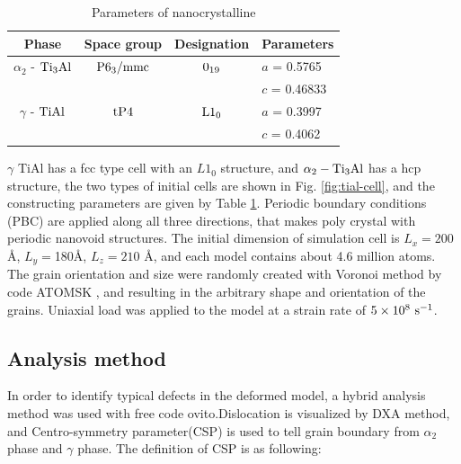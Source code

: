 \documentclass[metals,article,submit,moreauthors,pdftex,10pt,a4paper]{Definitions/mdpi}
\begin{document}
\begin{table}[ht]
	\caption{Parameters of nanocrystalline}
	\centering
	\begin{tabular}{c c c l}
	\toprule
	\textbf{Phase}			& {Space group}		& {Designation} 		& {Parameters} \\
	\midrule
	$\alpha_2$ - $\rm{Ti_3Al}$		& $\rm P6_3/mmc$ 	& $\rm 0_{19}$ 		& $a$ = 0.5765 \\
		&					&					& $c$ = 0.46833 \\
	$\gamma$ - $\rm{TiAl}$ 		& $\rm tP4$ 		& $\rm L1_0$		& $a$ = 0.3997 \\
		&					&					& $c$ = 0.4062 \\			
	\bottomrule
	\end{tabular} 
	\label{tab:lattice_parameter}
\end{table} 

$\gamma $ TiAl has a fcc type cell with an $L1_0$ structure, and $\alpha_2 -\rm Ti_3Al$ has a hcp structure, the two types of initial cells are shown in Fig. \ref{fig:tial-cell}, and the constructing parameters are given by Table \ref{tab:lattice_parameter}. Periodic boundary conditions (PBC) are applied along all three directions, that makes poly crystal with periodic nanovoid structures. The initial dimension of simulation cell is $L_x =200$ \si{\angstrom}, $L_y = $180\si{\angstrom}, $L_z = 210$ \si{\angstrom}, and each model contains about 4.6 million atoms. The grain orientation and size were randomly created with Voronoi method by code ATOMSK \cite{Hirel2015}, and resulting in the arbitrary shape and orientation of the grains. Uniaxial load was applied to the model at a strain rate of $5\times10^8\ \rm{s}^{-1}$. 
\subsection{Analysis method}
In order to identify typical defects in the deformed model, a hybrid analysis method was used with free code ovito\cite{Stukowski2010a}.Dislocation is visualized by DXA method, and Centro-symmetry parameter(CSP) is used to tell grain boundary from  $\alpha_2$ phase and $\gamma$ phase. The definition of CSP is as following:
\end{document}
